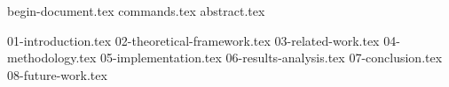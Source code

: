 \documentclass[english]{UNISINOSartigo}
\begin{document}
{begin-document.tex}
{commands.tex}
{abstract.tex}

{01-introduction.tex}
{02-theoretical-framework.tex}
{03-related-work.tex}
{04-methodology.tex}
{05-implementation.tex}
{06-results-analysis.tex}
{07-conclusion.tex}
{08-future-work.tex}


\end{document}
